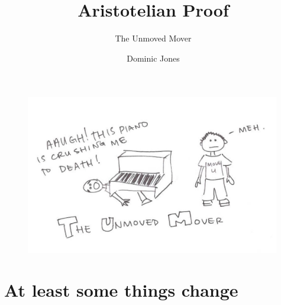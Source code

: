 \documentclass[xcolor=dvipsnames]{beamer}
\title{Aristotelian Proof}
\subtitle{The Unmoved Mover}
\author{Dominic Jones}
\begin{document}
\begin{frame}[plain]
  \titlepage
\end{frame}

\begin{frame}{}
\begin{figure}
  \centering
  \includegraphics[width=0.99\textwidth]{unmoved_mover}
\end{figure}
\end{frame}

\section{At least some things change}
\end{document}
